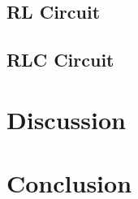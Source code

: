 \documentclass{article}
\begin{document}
  \subsection{RL Circuit} 

  \subsection{RLC Circuit}

\section{Discussion}

\section{Conclusion}
\end{document}
